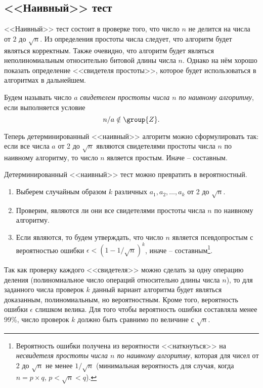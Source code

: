 \subsection{<<Наивный>> тест}\label{section-prime-check-naive}

<<Наивный>> тест состоит в проверке того, что число $n$ не делится на числа от $2$ до $\sqrt{n}$. Из определения простоты числа следует, что алгоритм будет являться корректным. Также очевидно, что алгоритм будет являться неполиномиальным относительно битовой длины числа $n$. Однако на нём хорошо показать определение <<свидетеля простоты>>, которое будет использоваться в алгоритмах в дальнейшем.

Будем называть число $a$ \emph{свидетелем простоты числа $n$ по наивному алгоритму}, если выполняется условие
\[
	n / a \notin \group{Z}.
\]

Теперь детерминированный <<наивный>> алгоритм можно сформулировать так: если все числа $a$ от 2 до $\sqrt{n}$ являются свидетелями простоты числа $n$ по наивному алгоритму, то число $n$ является простым. Иначе -- составным.

Детерминированный <<наивный>> тест можно превратить в вероятностный.

\begin{enumerate}
	\item Выберем случайным образом $k$ различных $a_1, a_2, \dots, a_k$ от 2 до $\sqrt{n}$.
	\item Проверим, являются ли они все свидетелями простоты числа $n$ по наивному алгоритму. 
	\item Если являются, то будем утверждать, что число $n$ является псевдопростым с вероятностью ошибки $\epsilon < \left( 1 - 1 / \sqrt{n} \right)^k$, иначе -- составным\footnote{Вероятность ошибки получена из вероятности <<наткнуться>> на \emph{несвидетеля простоты числа $n$ по наивному алгоритму}, которая для чисел от 2 до $\sqrt{n}$ не менее $1 / \sqrt{n}$ (минимальная вероятность для случая, когда $n = p \times q$, $p < \sqrt{n} < q$).}.
\end{enumerate}

Так как проверку каждого <<свидетеля>> можно сделать за одну операцию деления (полиномиальное число операций относительно длины числа $n$), то для заданного числа проверок $k$ данный вариант алгоритма будет являться доказанным, полиномиальным, но вероятностным. Кроме того, вероятность ошибки $\epsilon$ слишком велика. Для того чтобы вероятность ошибки составляла менее 99\%, число проверок $k$ должно быть сравнимо по величине с $\sqrt{n}$.
